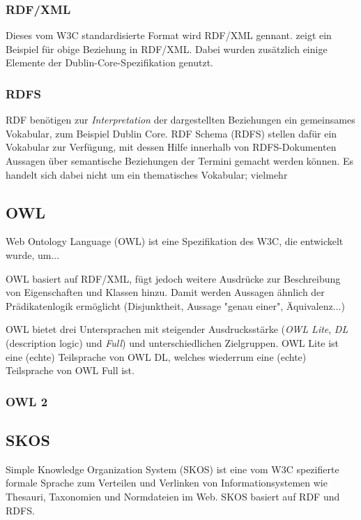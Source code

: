 	\subsubsection{RDF/XML}
	Dieses vom W3C standardisierte Format wird RDF/XML gennant.  zeigt ein Beispiel für obige Beziehung in RDF/XML. Dabei wurden zusätzlich einige Elemente der Dublin-Core-Spezifikation genutzt.
	

	\subsubsection{RDFS}
	RDF benötigen zur \emph{Interpretation} der dargestellten Beziehungen ein gemeinsames Vokabular, zum Beispiel Dublin Core. RDF Schema (RDFS) stellen dafür ein Vokabular zur Verfügung, mit dessen Hilfe innerhalb von RDFS-Dokumenten Aussagen über semantische Beziehungen der Termini gemacht werden können. Es handelt sich dabei nicht um ein thematisches Vokabular; vielmehr 

	\subsection{OWL}
	Web Ontology Language (OWL) ist eine Spezifikation des W3C, die entwickelt wurde, um...
	
	OWL basiert auf RDF/XML, fügt jedoch weitere Ausdrücke zur Beschreibung von Eigenschaften und Klassen hinzu. Damit werden Aussagen ähnlich der Prädikatenlogik ermöglicht (Disjunktheit, Aussage "genau einer", Äquivalenz...)
	
	OWL bietet drei Untersprachen mit steigender Ausdrucksstärke (\emph{OWL Lite}, \emph{DL} (description logic) und \emph{Full}) und unterschiedlichen Zielgruppen. OWL Lite ist eine (echte) Teilsprache von OWL DL, welches wiederrum eine (echte) Teilsprache von OWL Full ist.
	
	
	\subsubsection{OWL 2}
	
	\subsection{SKOS}
	Simple Knowledge Organization System (SKOS) ist eine vom W3C spezifierte formale Sprache zum Verteilen und Verlinken von Informationsystemen wie Thesauri, Taxonomien und Normdateien im Web. SKOS basiert auf RDF und RDFS.
	
